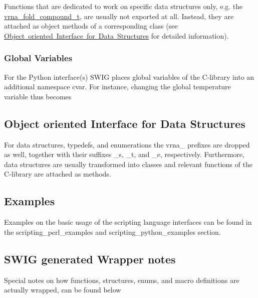 Functions that are dedicated to work on specific data structures only, e.\+g. the \mbox{\hyperlink{group__fold__compound_ga1b0cef17fd40466cef5968eaeeff6166}{vrna\+\_\+fold\+\_\+compound\+\_\+t}}, are usually not exported at all. Instead, they are attached as object methods of a corresponding class (see \mbox{\hyperlink{wrappers_scripting_oo_interface}{Object oriented Interface for Data Structures}} for detailed information).\hypertarget{wrappers_scripting_globals}{}\subsubsection{Global Variables}\label{wrappers_scripting_globals}
For the Python interface(s) S\+W\+IG places global variables of the C-\/library into an additional namespace {\ttfamily cvar}. For instance, changing the global temperature variable thus becomes 
\begin{DoxyCode}{0}
\end{DoxyCode}
\hypertarget{wrappers_scripting_oo_interface}{}\subsection{Object oriented Interface for Data Structures}\label{wrappers_scripting_oo_interface}
For data structures, typedefs, and enumerations the {\ttfamily vrna\+\_\+} prefixes are dropped as well, together with their suffixes {\ttfamily \+\_\+s}, {\ttfamily \+\_\+t}, and {\ttfamily \+\_\+e}, respectively. Furthermore, data structures are usually transformed into classes and relevant functions of the C-\/library are attached as methods.\hypertarget{wrappers_scripting_examples}{}\subsection{Examples}\label{wrappers_scripting_examples}
Examples on the basic usage of the scripting language interfaces can be found in the scripting\+\_\+perl\+\_\+examples and scripting\+\_\+python\+\_\+examples section.\hypertarget{wrappers_scripting_wrapper_notes}{}\subsection{S\+W\+I\+G generated Wrapper notes}\label{wrappers_scripting_wrapper_notes}
Special notes on how functions, structures, enums, and macro definitions are actually wrapped, can be found below


